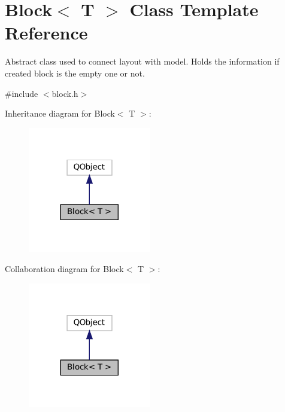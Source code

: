 \hypertarget{class_block}{}\section{Block$<$ T $>$ Class Template Reference}
\label{class_block}


Abstract class used to connect layout with model. Holds the information if created block is the empty one or not.  




{\ttfamily \#include $<$block.\+h$>$}



Inheritance diagram for Block$<$ T $>$\+:
\nopagebreak
\begin{figure}[H]
\begin{center}
\leavevmode
\includegraphics[width=152pt]{class_block__inherit__graph}
\end{center}
\end{figure}


Collaboration diagram for Block$<$ T $>$\+:
\nopagebreak
\begin{figure}[H]
\begin{center}
\leavevmode
\includegraphics[width=152pt]{class_block__coll__graph}
\end{center}
\end{figure}
